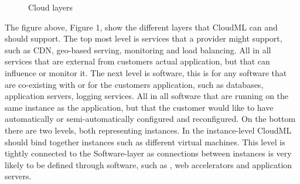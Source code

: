 \begin{figure}
  \caption{Cloud layers}
\end{figure}

The figure above, Figure 1, show the different layers that CloudML can and should support. 
The top most level is services that a provider might support, such as CDN, geo-based serving, monitoring and load balancing. 
All in all services that are external from customers actual application, but that can influence or monitor it.
The next level is software, this is for any software that are co-existing with or for the customers application, 
such as databases, application servers, logging services. All in all software that are running on the same instance as the application, 
but that the customer would like to have automatically or semi-automatically configured and reconfigured.
On the bottom there are two levels, both representing instances. In the instance-level CloudML should bind together instances 
such as different virtual machines. This level is tightly connected to the Software-layer as connections between instances 
is very likely to be defined through software, such as , web accelerators and application servers.
